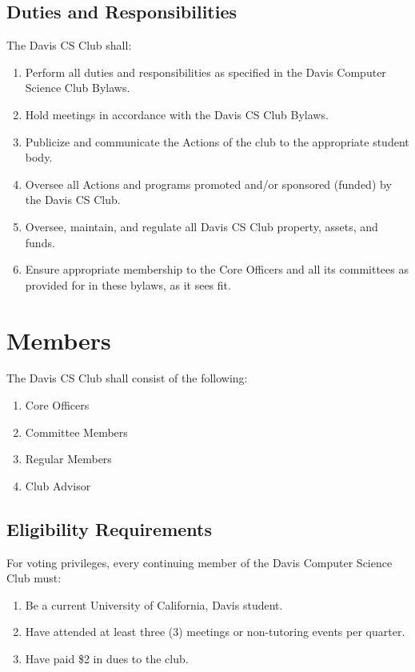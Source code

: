 \documentclass{article}
\newenvironment{li}{
\begin{enumerate}
  \setlength{\itemsep}{1pt}
  \setlength{\parskip}{0pt}
  \setlength{\parsep}{0pt}
}{\end{enumerate}}
\begin{document}
\subsection{Duties and Responsibilities}
The Davis CS Club shall:
\begin{li}
\item Perform all duties and responsibilities as specified in the Davis Computer Science Club Bylaws.
\item Hold meetings in accordance with the Davis CS Club Bylaws.
\item Publicize and communicate the Actions of the club to the appropriate student body.
\item Oversee all Actions and programs promoted and/or sponsored (funded) by the Davis CS Club.
\item Oversee, maintain, and regulate all Davis CS Club property, assets, and funds.
\item Ensure appropriate membership to the Core Officers and all its committees as provided for in these bylaws, as it sees fit.
\end{li}


\section{Members}
The Davis CS Club shall consist of the following:
\begin{li}
\item Core Officers
\item Committee Members
\item Regular Members
\item Club Advisor
\end{li}

\subsection{Eligibility Requirements}
For voting privileges, every continuing member of the Davis Computer Science Club must:
\begin{li}
\item Be a current University of California, Davis student.
\item Have attended at least three (3) meetings or non-tutoring events per quarter.
\item Have paid \$2 in dues to the club.
\end{li}
\end{document}
